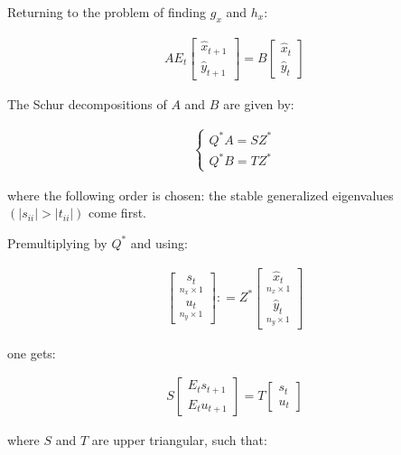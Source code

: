 \documentclass{pracamgr}
\numberwithin{equation}{section}
\begin{document}
Returning to the problem of finding $g_x$ and $h_x$:

\begin{eqnarray}
    A E_t \begin{bmatrix} \widehat{x}_{t+1} \\ \widehat{y}_{t+1} \end{bmatrix} = B\begin{bmatrix} \widehat{x}_t\\ \widehat{y}_t \end{bmatrix}
  \end{eqnarray}

The Schur decompositions of $A$ and $B$ are given by:

\begin{align}
\left\{
\begin{array}{cl}
Q^* A = S Z^* \\
Q^* B = T Z^*
\end{array}
\right.
\end{align}

where the following order is chosen: the stable generalized eigenvalues $(|s_{ii}|>|t_{ii}|)$ come first. 

Premultiplying by $Q^*$ and using:

\begin{align}
\begin{bmatrix} \underset{n_x \times 1}{s_t} \\ \underset{n_y\times1}{u_t} \end{bmatrix} : = Z^* \begin{bmatrix} \underset{n_x \times 1}{\widehat{x}_t} \\ \underset{n_y \times 1}{\widehat{y}_t} \end{bmatrix}\end{align}

one gets:

\begin{align}
  S  \begin{bmatrix} E_t s_{t+1}\\ E_t u_{t+1} \end{bmatrix} = T \begin{bmatrix} s_t \\ u_t \end{bmatrix}
\end{align}

where $S$ and $T$ are upper triangular, such that:
\end{document}
